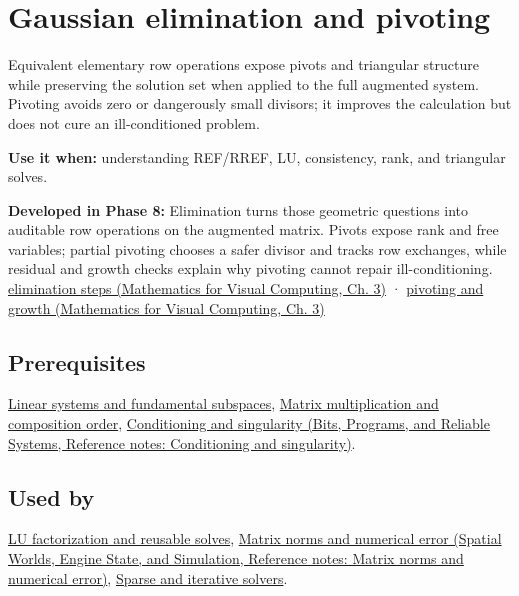 \hypertarget{appendix-f6e77f4a200f}{}\label{referencestart:appendix-f6e77f4a200f}
\section{Gaussian elimination and pivoting}\label{appendix-f6e77f4a200f-gaussian-elimination-and-pivoting}

Equivalent elementary row operations expose pivots and triangular structure while preserving the solution set when applied to the full augmented system. Pivoting avoids zero or dangerously small divisors; it improves the calculation but does not cure an ill-conditioned problem.

\textbf{Use it when:} understanding REF/RREF, LU, consistency, rank, and triangular solves.

\textbf{Developed in Phase 8:} Elimination turns those geometric questions into auditable row operations on the augmented matrix. Pivots expose rank and free variables; partial pivoting chooses a safer divisor and tracks row exchanges, while residual and growth checks explain why pivoting cannot repair ill-conditioning. \href{../02-Mathematics-for-Visual-Computing/main.pdf\#nameddest=01-foundations-i-ch019-elimination-turns-the-geometry-into-an-auditable-calculation}{elimination steps (Mathematics for Visual Computing, Ch. 3)} · \href{../02-Mathematics-for-Visual-Computing/main.pdf\#nameddest=01-foundations-i-ch019-pivoting-separates-algorithm-failure-from-matrix-failure}{pivoting and growth (Mathematics for Visual Computing, Ch. 3)}

\subsection{Prerequisites}\label{appendix-f6e77f4a200f-prerequisites}

\hyperref[appendix-8572a4a060c1]{Linear systems and fundamental subspaces}, \hyperref[appendix-ab31ef447dbf]{Matrix multiplication and composition order}, \href{../01-Bits-Programs-and-Reliable-Systems/main.pdf\#nameddest=appendix-8f6a01f284a7}{Conditioning and singularity (Bits, Programs, and Reliable Systems, Reference notes: Conditioning and singularity)}.

\subsection{Used by}\label{appendix-f6e77f4a200f-used-by}

\hyperref[appendix-55e4b5b0a1e6]{LU factorization and reusable solves}, \href{../05-Spatial-Worlds-Engine-State-and-Simulation/main.pdf\#nameddest=appendix-f8657bac66e5}{Matrix norms and numerical error (Spatial Worlds, Engine State, and Simulation, Reference notes: Matrix norms and numerical error)}, \hyperref[appendix-67c87a3d9e94]{Sparse and iterative solvers}.

